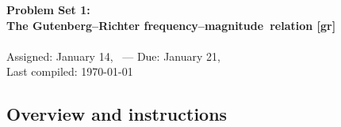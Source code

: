 \documentclass[11pt,titlepage,fleqn]{article}
\newcommand{\fmag}{frequency--magnitude}
\begin{document}

\begin{spacing}{1.2}
\centering
{\large \bf Problem Set 1: \\
The Gutenberg--Richter \fmag\ relation [gr]} \\
\cltag\ \\
Assigned: January 14, \cyear\ --- Due: January 21, \cyear\ \\
Last compiled: \today
\end{spacing}


\subsection*{Overview and instructions}
\end{document}
